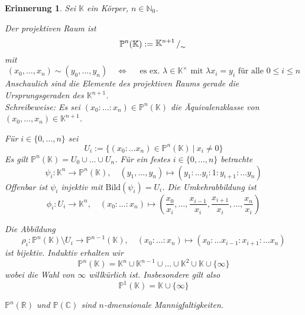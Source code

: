 \documentclass[11pt]{book}
\newtheorem{erinner}[theorem]{Erinnerung}
\theoremstyle{nonumberbreak}
\newenvironment{definbem}[1][]{\ifthenelse{\equal{#1}{}}{\definibem}{\definibem[#1]}\rm}{\enddefinibem}
\newcommand{\slant}[2]{{\raisebox{.1em}{$#1$}\left/\raisebox{-.1em}{$#2$}\right.}}
\begin{document}
\begin{spacing}{1.3}
\begin{erinner} %
 Sei $\mathbb{K}$ ein Körper, $n \in \mathbb{N}_0$.
 \begin{compactenum}
 \item Der \textit{projektiven Raum} ist
 $$\mathbb{P}^n(\mathbb{K}):= \slant{\mathbb{K}^{n+1}}{_\sim}$$
 mit
 $$(x_0, \ldots, x_n) \sim (y_0, \ldots, y_n) \quad \Longleftrightarrow \quad \textrm{ es ex. } \lambda \in \mathbb{K}^{\times} \textrm{ mit } \lambda x_i = y_i \textrm{ für alle } 0\leqslant i \leqslant n$$
 Anschaulich sind die Elemente des projektiven Raums gerade die Ursprungsgeraden des $\mathbb{K}^{n+1}$.\\
 Schreibeweise: Es sei $(x_0: \ldots :x_n) \in \mathbb{P}^n(\mathbb{K})$ die Äquivalenzklasse von $(x_0, \ldots, x_n) \in \mathbb{K}^{n+1}$.
 \item Für $i \in \{0,\ldots, n \}$ sei 
 $$U_i:= \{(x_0: \ldots x_n) \in \mathbb{P}^n(\mathbb{K}) \ \vert \ x_i \neq 0\}$$
 Es gilt $\mathbb{P}^n(\mathbb{K}) = U_0 \cup \ldots \cup U_n$. Für ein festes $i \in \{0, \ldots, n\}$ betrachte
 $$\psi_i: \mathbb{K}^{n} \longrightarrow \mathbb{P}^n(\mathbb{K}), \quad (y_1, \ldots, y_n) \mapsto (y_1: \ldots y_i : 1 : y_{i+1} : \ldots y_n)$$
 Offenbar ist $\psi_i$ injektiv mit $\textrm{Bild}(\psi_i)=U_i$. Die Umkehrabbildung ist
 $$\phi_i: U_i \longrightarrow \mathbb{K}^n, \quad (x_0: \ldots : x_n) \mapsto \left( \frac{x_0}{x_i}, \ldots, \frac{x_{i-1}}{x_i}, \frac{x_{i+1}}{x_i}, \ldots, \frac{x_n}{x_i}\right)$$
 \item Die Abbildung
 $$\rho_i: \mathbb{P}^n(\mathbb{K}) \setminus U_i \longrightarrow \mathbb{P}^{n-1}(\mathbb{K}), \quad (x_0: \ldots: x_n) \mapsto (x_0:\ldots x_{i-1} : x_{i+1}: \ldots x_n)$$
 ist bijektiv. Induktiv erhalten wir
 $$\mathbb{P}^n(\mathbb{K}) = \mathbb{K}^n \cup \mathbb{K}^{n-1} \cup \dots \cup \mathbb{K}^2 \cup \mathbb{K} \cup \{\infty \}$$
 wobei die Wahl von $\mathbb{\infty}$ willkürlich ist. Insbesondere gilt also 
 $$\mathbb{P}^1(\mathbb{K}) = \mathbb{K} \cup \{\infty \}$$
 \item $\mathbb{P}^n(\mathbb{R})$ und $\mathbb{P}(\mathbb{C})$ sind $n$-dmensionale Mannigfaltigkeiten.
 
 \end{compactenum}
 \end{erinner}
 
\begin{definbem} %
 

\end{definbem}
\end{spacing}
\end{document}
